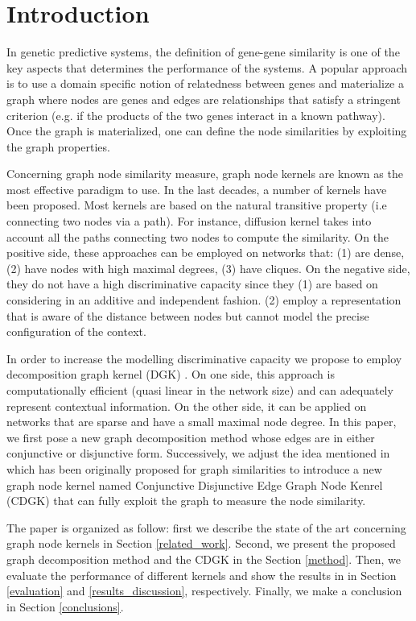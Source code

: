 \documentclass{esannV2}
\begin{document}
\section{Introduction} \label{introduction}
In genetic predictive systems, the definition of gene-gene similarity is one of the key aspects that determines the performance of the systems. A popular approach is to use a domain specific notion of relatedness between genes and materialize a graph where nodes are genes and edges are relationships that satisfy a stringent criterion (e.g. if the products of the two genes interact in a known pathway). 
Once the graph is materialized, one can define the node similarities by exploiting the graph properties.

Concerning graph node similarity measure, graph node kernels are known as the most effective paradigm to use. In the last decades, a number of kernels have been proposed. Most kernels are based on the natural transitive property (i.e connecting two nodes via a path). For instance, diffusion kernel takes into account all the paths connecting two nodes to compute the similarity. On the positive side, these approaches can be employed on networks that: (1) are dense, (2) have nodes with high maximal degrees, (3) have cliques. On the negative side, they do not have a high discriminative capacity since they (1) are based on considering in an additive and independent fashion. (2) employ a representation that is aware of the distance between nodes but cannot model the precise configuration of the context.

In order to increase the modelling discriminative capacity we propose to employ decomposition graph kernel (DGK) \cite{covolution_kernel}. On one side, this approach is computationally efficient (quasi linear in the network size) and can adequately represent contextual information. On the other side, it can be applied on networks that are sparse and have a small maximal node degree. In this paper, we first pose a new graph decomposition method whose edges are in either conjunctive or disjunctive form. Successively, we adjust the idea mentioned in \cite{nspdk} which has been originally proposed for graph similarities to introduce a new graph node kernel named Conjunctive Disjunctive Edge Graph Node Kenrel (CDGK) that can fully exploit the graph to measure the node similarity.

The paper is organized as follow: first we describe the state of the art concerning graph node kernels in Section \ref{related_work}. Second, we present the proposed graph decomposition method and the CDGK in the Section \ref{method}. Then, we evaluate the performance of different kernels and show the results in in Section \ref{evaluation} and \ref{results_discussion}, respectively. Finally, we make a conclusion in Section \ref{conclusions}.
\end{document}
